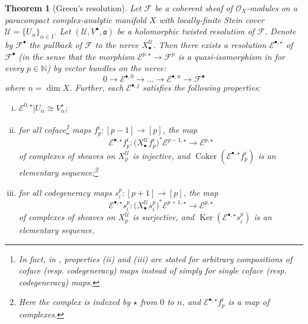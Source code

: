 \documentclass[11pt,fleqn]{article}
\theoremstyle{plain}
\newtheorem{theorem}{Theorem}[subsection]
\theoremstyle{definition}
\theoremstyle{remark}
\numberwithin{equation}{theorem}
\newcommand{\cover}{\mathcal{U}}
\newcommand{\OO}{\mathcal{O}}
\newcommand{\anotherbullet}{\star}
\newcommand{\restricted}{\mathbin{\big\vert}}
\newcommand{\twc}{\mathfrak{a}}
\newcommand{\nerve}[1]{X_{#1}^\cover}
\DeclareMathOperator{\Ker}{Ker}
\DeclareMathOperator{\Coker}{Coker}
\begin{document}
        \begin{theorem}[Green's resolution]\label{theorem:green's-resolution}
            Let $\mathscr{F}$ be a coherent sheaf of $\OO_X$-modules on a paracompact complex-analytic manifold $X$ with locally-finite Stein cover $\cover=\{U_\alpha\}_{\alpha\in I}$.
            Let $(\cover,V^\bullet,\twc)$ be a holomorphic twisted resolution of $\mathscr{F}$.
            Denote by $\mathscr{F}^\bullet$ the pullback of $\mathscr{F}$ to the nerve $\nerve{\bullet}$.
            Then there exists a resolution $\mathcal{E}^{\bullet,\anotherbullet}$ of $\mathscr{F}^\bullet$ (in the sense that the morphism $\mathcal{E}^{p,\anotherbullet}\to\mathscr{F}^p$ is a quasi-isomorphism in for every $p\in\mathbb{N}$) by vector bundles on the nerve:
            \begin{equation*}
                0 \to \mathcal{E}^{\bullet,0} \to \ldots \to \mathcal{E}^{\bullet,n} \to \mathscr{F}^\bullet
            \end{equation*}
            where $n=\dim X$.
            Further, each $\mathcal{E}^{\bullet,j}$ satisfies the following properties:
            \begin{enumerate}[(i)]
                \item $\mathcal{E}^{0,\anotherbullet}\restricted {U_\alpha} \cong V^\anotherbullet_\alpha$;
                \item for all coface\footnote{In fact, in \cite[§1.4]{Green1980}, properties (ii) and (iii) are stated for arbitrary compositions of coface (resp. codegeneracy) maps instead of simply for single coface (resp. codegeneracy) maps.} maps $f_p^i\colon[p-1]\to[p]$, the map
                    \[
                        \mathcal{E}^{\bullet,\anotherbullet} f_p^i\colon \big(\nerve{\bullet} f_p^i\big)^*\mathcal{E}^{p-1,\anotherbullet}\to\mathcal{E}^{p,\anotherbullet}
                    \]
                    of complexes of sheaves on $\nerve{p}$ is injective, and $\Coker\left(\mathcal{E}^{\bullet,\anotherbullet} f_p^i\right)$ is an elementary sequence;\footnote{Here the complex is indexed by $\anotherbullet$ from $0$ to $n$, and $\mathcal{E}^{\bullet,\anotherbullet} f_p^i$ is a map of complexes.}
                \item for all codegeneracy maps $s_i^p\colon[p+1]\to[p]$, the map
                    \[
                        \mathcal{E}^{\bullet,\anotherbullet} s_i^p\colon \big(\nerve{\bullet} s_i^p\big)^*\mathcal{E}^{p+1,\anotherbullet}\to\mathcal{E}^{p,\anotherbullet}
                    \]
                    of complexes of sheaves on $\nerve{p}$ is surjective, and $\Ker\left(\mathcal{E}^{\bullet,\anotherbullet} s_i^p\right)$ is an elementary sequence.

\end{enumerate}
\end{theorem}
\end{document}
